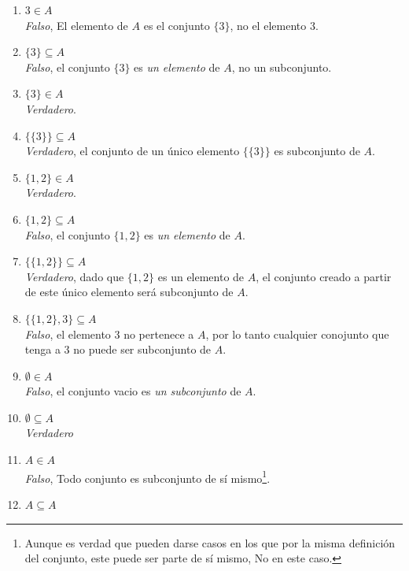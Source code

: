 \documentclass[a4paper,10pt]{article}
\begin{document}
\begin{enumerate}
\begin{enumerate}[label = \roman*)]
            \item $3\in A$\\
                \colorbox{g}{\textit{Falso}}, El elemento de $A$ es el conjunto $\{3\}$, no el elemento $3$.
            \item $\{3\} \subseteq A$\\
                \colorbox{g}{\textit{Falso}}, el conjunto $\{3\}$ es \textit{un elemento} de $A$, no un subconjunto.
            \item $\{3\} \in A$\\
                \colorbox{g}{\textit{Verdadero}}.
            \item $\{\{3\}\} \subseteq A$\\
                \colorbox{g}{\textit{Verdadero}}, el conjunto de un \'unico elemento $\{\{3\}\}$ es subconjunto de $A$.
            \item $\{1,2\} \in A$\\
                \colorbox{g}{\textit{Verdadero}}.
            \item $\{1,2\} \subseteq A$\\
                \colorbox{g}{\textit{Falso}}, el conjunto $\{1,2\}$ es \textit{un elemento} de $A$.
            \item $\{\{1,2\}\} \subseteq A$\\
                \colorbox{g}{\textit{Verdadero}}, dado que $\{1,2\}$ es un elemento de $A$, el conjunto creado a partir de este \'unico elemento ser\'a subconjunto de $A$.
            \item $\{\{1,2\},3\} \subseteq A$\\
                \colorbox{g}{\textit{Falso}}, el elemento $3$ no pertenece a $A$, por lo tanto cualquier conojunto que tenga a $3$ no puede ser subconjunto de $A$.
            \item $\emptyset \in A$\\
                \colorbox{g}{\textit{Falso}}, el conjunto vacio es \textit{un subconjunto} de $A$.
            \item $\emptyset \subseteq A$\\
                \colorbox{g}{\textit{Verdadero}}
            \item $A\in A$\\
                \colorbox{g}{\textit{Falso}}, Todo conjunto es subconjunto de s\'i mismo\footnote{Aunque es verdad que pueden darse casos en los que por la misma definici\'on del conjunto, este puede ser parte de s\'i mismo, No en este caso.}.
            \item $A\subseteq A$\\

\end{enumerate}
\end{enumerate}
\end{document}
